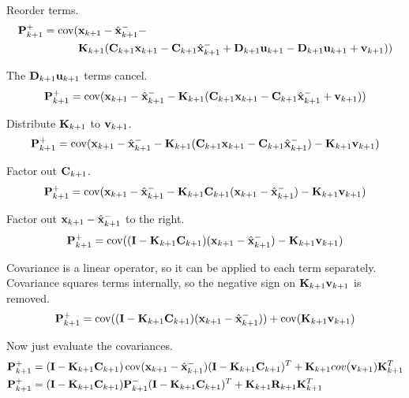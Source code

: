 Reorder terms.
\begin{align*}
  \mathbf{P}_{k+1}^+ = \operatorname{cov}(&\mathbf{x}_{k+1} - \hat{\mathbf{x}}_{k+1}^- - \\
    &\mathbf{K}_{k+1}(\mathbf{C}_{k+1} \mathbf{x}_{k+1} -
      \mathbf{C}_{k+1} \hat{\mathbf{x}}_{k+1}^- + \mathbf{D}_{k+1} \mathbf{u}_{k+1} -
      \mathbf{D}_{k+1}\mathbf{u}_{k+1} + \mathbf{v}_{k+1}))
\end{align*}

The $\mathbf{D}_{k+1}\mathbf{u}_{k+1}$ terms cancel.
\begin{equation*}
  \mathbf{P}_{k+1}^+ = \operatorname{cov}(\mathbf{x}_{k+1} - \hat{\mathbf{x}}_{k+1}^- -
    \mathbf{K}_{k+1}(\mathbf{C}_{k+1}\mathbf{x}_{k+1} -
    \mathbf{C}_{k+1} \hat{\mathbf{x}}_{k+1}^- + \mathbf{v}_{k+1}))
\end{equation*}

Distribute $\mathbf{K}_{k+1}$ to $\mathbf{v}_{k+1}$.
\begin{equation*}
  \mathbf{P}_{k+1}^+ = \operatorname{cov}(\mathbf{x}_{k+1} - \hat{\mathbf{x}}_{k+1}^- -
    \mathbf{K}_{k+1}(\mathbf{C}_{k+1}\mathbf{x}_{k+1} -
    \mathbf{C}_{k+1} \hat{\mathbf{x}}_{k+1}^-) - \mathbf{K}_{k+1}\mathbf{v}_{k+1})
\end{equation*}

Factor out $\mathbf{C}_{k+1}$.
\begin{equation*}
  \mathbf{P}_{k+1}^+ = \operatorname{cov}(\mathbf{x}_{k+1} - \hat{\mathbf{x}}_{k+1}^- -
    \mathbf{K}_{k+1}\mathbf{C}_{k+1}(\mathbf{x}_{k+1} - \hat{\mathbf{x}}_{k+1}^-) -
    \mathbf{K}_{k+1}\mathbf{v}_{k+1})
\end{equation*}

Factor out $\mathbf{x}_{k+1} - \hat{\mathbf{x}}_{k+1}^-$ to the right.
\begin{equation*}
  \mathbf{P}_{k+1}^+ = \operatorname{cov}((\mathbf{I} - \mathbf{K}_{k+1}\mathbf{C}_{k+1})
    (\mathbf{x}_{k+1} - \hat{\mathbf{x}}_{k+1}^-) - \mathbf{K}_{k+1}\mathbf{v}_{k+1})
\end{equation*}

Covariance is a linear operator, so it can be applied to each term separately.
Covariance squares terms internally, so the negative sign on
$\mathbf{K}_{k+1}\mathbf{v}_{k+1}$ is removed.
\begin{equation*}
  \mathbf{P}_{k+1}^+ = \operatorname{cov}((\mathbf{I} - \mathbf{K}_{k+1}\mathbf{C}_{k+1})
    (\mathbf{x}_{k+1} - \hat{\mathbf{x}}_{k+1}^-)) + \operatorname{cov}(\mathbf{K}_{k+1}\mathbf{v}_{k+1})
\end{equation*}

Now just evaluate the covariances.
\begin{align*}
  \mathbf{P}_{k+1}^+ &= (\mathbf{I} - \mathbf{K}_{k+1}\mathbf{C}_{k+1})
    \operatorname{cov}(\mathbf{x}_{k+1} - \hat{\mathbf{x}}_{k+1}^-)
    (\mathbf{I} - \mathbf{K}_{k+1}\mathbf{C}_{k+1})^T + \mathbf{K}_{k+1}cov(\mathbf{v}_{k+1})
    \mathbf{K}_{k+1}^T \\
  \mathbf{P}_{k+1}^+ &= (\mathbf{I} - \mathbf{K}_{k+1}\mathbf{C}_{k+1})\mathbf{P}_{k+1}^-
    (\mathbf{I} - \mathbf{K}_{k+1}\mathbf{C}_{k+1})^T + \mathbf{K}_{k+1}\mathbf{R}_{k+1}
    \mathbf{K}_{k+1}^T
\end{align*}

